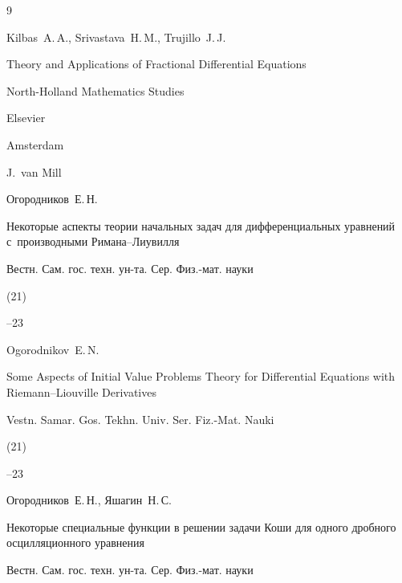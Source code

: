 \begin{thebibliography}{9}




\by Kilbas~A.\,A., Srivastava~H.\,M., Trujillo~J.\,J.

\book Theory and Applications of Fractional Differential Equations

\serial North-Holland Mathematics Studies



\publ Elsevier

\publaddr Amsterdam

\ed J.~van Mill







\by Огородников~Е.\,Н.

\paper Некоторые аспекты теории начальных задач для дифференциальных уравнений с~производными Римана--Лиувилля

\jour Вестн. Сам. гос. техн. ун-та. Сер. Физ.-мат. науки


(21)

--23

\misctransl

\by Ogorodnikov~E.\,N.

\paper Some Aspects of Initial Value Problems Theory for Differential Equations with Riemann--Liouville Derivatives

\jour Vestn. Samar. Gos. Tekhn. Univ. Ser. Fiz.-Mat. Nauki


(21)

--23




\by Огородников~Е.\,Н., Яшагин~Н.\,С.

\paper Некоторые специальные функции в решении задачи Коши для одного дробного осцилляционного уравнения

\jour Вестн. Сам. гос. техн. ун-та. Сер. Физ.-мат. науки



\end{thebibliography}
